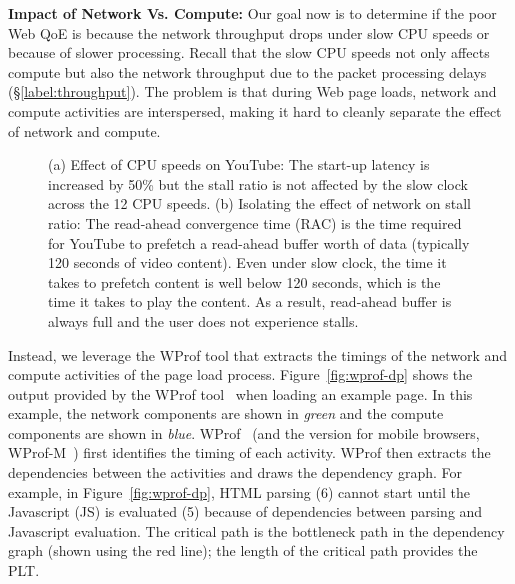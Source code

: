 {\noindent \bf Impact of Network Vs. Compute:}
Our goal now is to determine if the poor Web QoE is because the network throughput drops under slow CPU speeds or  because of slower processing. Recall that the slow CPU speeds not only affects compute but also the network throughput due to the packet processing delays (\S\ref{label:throughput}). The problem is that during Web page loads, network and compute activities are interspersed, making it hard to cleanly separate the effect of network and compute. 
 
 \begin{figure*}[h]
    \caption{(a) Effect of CPU speeds on YouTube: The start-up latency is increased by 50\% but the stall ratio is not affected by the slow clock across the 12 CPU speeds. (b) Isolating the effect of network on stall ratio: The read-ahead convergence time (RAC) is the time required for YouTube to prefetch a read-ahead buffer worth of data (typically 120 seconds of video content). Even under slow clock, the time it takes to prefetch content is well below 120 seconds, which is the time it takes to play the content. As a result, read-ahead buffer is always full and the user does not experience stalls. }
   \vspace{-0.2in}
  \label{fig:youtube}
\end{figure*}

 
Instead, we leverage the WProf tool that extracts the timings of the network and compute activities of the page load process. Figure~\ref{fig:wprof-dp} shows the output provided by the WProf tool~\cite{wang2013demystifying,nejati2016depth} when loading an example page. In this example, the network components are shown in {\em green} and the compute components are shown in {\em blue}. WProf~\cite{wang2013demystifying} (and the version for mobile browsers, WProf-M~\cite{nejati2016depth}) first identifies the timing of each activity. WProf then extracts the dependencies between the activities and draws the dependency graph. For example, in Figure~\ref{fig:wprof-dp}, HTML parsing (6) cannot start until the Javascript (JS) is evaluated (5) because of dependencies between parsing and Javascript evaluation.  The critical path is the bottleneck path in the dependency graph (shown using the red line); the length of the critical path provides the PLT. %

